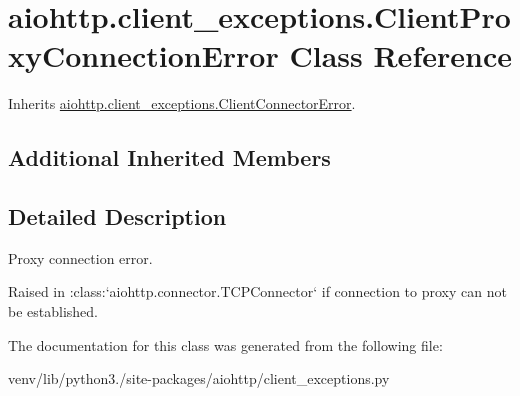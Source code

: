 \hypertarget{classaiohttp_1_1client__exceptions_1_1_client_proxy_connection_error}{}\section{aiohttp.\+client\+\_\+exceptions.\+Client\+Proxy\+Connection\+Error Class Reference}
\label{classaiohttp_1_1client__exceptions_1_1_client_proxy_connection_error}


Inherits \hyperlink{classaiohttp_1_1client__exceptions_1_1_client_connector_error}{aiohttp.\+client\+\_\+exceptions.\+Client\+Connector\+Error}.

\subsection*{Additional Inherited Members}


\subsection{Detailed Description}
\begin{DoxyVerb}Proxy connection error.

Raised in :class:`aiohttp.connector.TCPConnector` if
    connection to proxy can not be established.
\end{DoxyVerb}
 

The documentation for this class was generated from the following file\+:\begin{DoxyCompactItemize}
\item 
venv/lib/python3./site-\/packages/aiohttp/client\+\_\+exceptions.\+py\end{DoxyCompactItemize}
